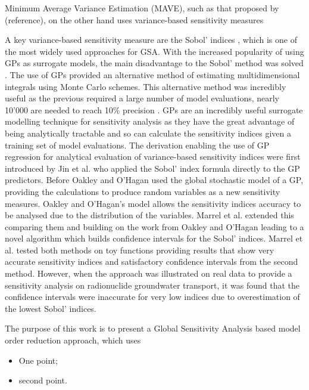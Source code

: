 \documentclass[preprint,12pt]{elsarticle}
\begin{document}
        Minimum Average Variance Estimation (MAVE), such as that  proposed by (reference), on the other hand uses variance-based sensitivity measures 
         
A key variance-based sensitivity measure are the Sobol' indices \cite{Sobol2001}, which is one of the most widely used approaches for GSA. With the increased popularity of using GPs as surrogate models, the main disadvantage to the Sobol' method was solved \cite{Oakley2004,Jin2004,Marrel2009}. The use of GPs provided an alternative method of estimating multidimensional integrals using Monte Carlo schemes. This alternative method was incredibly useful as the previous required a large number of model evaluations, nearly 10'000 are needed to reach 10\% precision \cite{Lamoureux2014}. GPs are an incredibly useful surrogate modelling technique for sensitivity analysis as they have the great advantage of being analytically tractable and so can calculate the sensitivity indices given a training set of model evaluations.  The derivation enabling the use of GP regression for analytical evaluation of variance-based sensitivity indices were first introduced by Jin et al. \cite{Jin2004} who applied the Sobol' index formula directly to the GP predictors. Before Oakley and O'Hagan \cite{Oakley2004} used the global stochastic model of a GP, providing the calculations to produce random variables as a new sensitivity measures. Oakley and O'Hagan's \cite{Oakley2004} model allows the sensitivity indices accuracy to be analysed due to the distribution of the variables. Marrel et al. \cite{Marrel2009} extended this comparing them and building on the work from Oakley and O'Hagan \cite{Oakley2004} leading to a novel algorithm which builds confidence intervals for the Sobol' indices. Marrel et al. \cite{Marrel2009} tested both methods on toy functions providing results that show very accurate sensitivity indices and satisfactory confidence intervals from the second method. However, when the approach was illustrated on real data to provide a sensitivity analysis on radionuclide groundwater transport, it was found that the confidence intervals were inaccurate for very low indices due to overestimation of the lowest Sobol' indices.

The purpose of this work is to present a Global Sensitivity Analysis based model order reduction approach, which uses 
\begin{itemize}
\item One point; 
\item second point.
\end{itemize}
\end{document}
